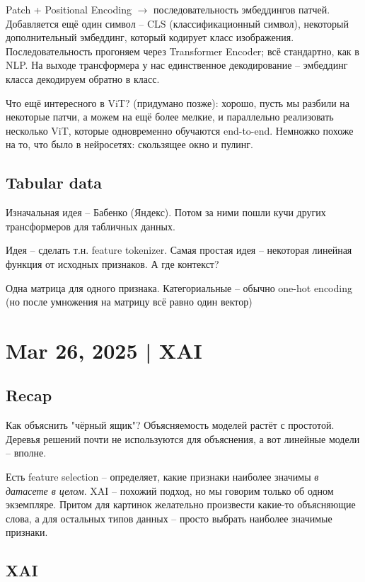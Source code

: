 \documentclass[a4paper,12pt]{article}
\begin{document}
Patch + Positional Encoding $ \to $ последовательность эмбеддингов патчей.
Добавляется ещё один символ -- CLS (классификационный символ), некоторый дополнительный эмбеддинг, который кодирует класс изображения.
Последовательность прогоняем через Transformer Encoder; всё стандартно, как в NLP.
На выходе трансформера у нас единственное декодирование -- эмбеддинг класса декодируем обратно в класс.

Что ещё интересного в ViT? (придумано позже): хорошо, пусть мы разбили на некоторые патчи, а можем на ещё более мелкие, и параллельно реализовать несколько ViT, которые одновременно обучаются end-to-end.
Немножко похоже на то, что было в нейросетях: скользящее окно и пулинг.

\subsection{Tabular data}

Изначальная идея -- Бабенко (Яндекс).
Потом за ними пошли кучи других трансформеров для табличных данных.

Идея -- сделать т.н. feature tokenizer.
Самая простая идея -- некоторая линейная функция от исходных признаков.
А где контекст?

Одна матрица для одного признака.
Категориальные -- обычно one-hot encoding (но после умножения на матрицу всё равно один вектор)

\section{Mar 26, 2025 | XAI}
\subsection{Recap}

Как объяснить "чёрный ящик"?
Объясняемость моделей растёт с простотой.
Деревья решений почти не используются для объяснения, а вот линейные модели -- вполне.

Есть feature selection -- определяет, какие признаки наиболее значимы \textit{в датасете в целом}.
XAI -- похожий подход, но мы говорим только об одном экземпляре.
Притом для картинок желательно произвести какие-то объясняющие слова, а для остальных типов данных -- просто выбрать наиболее значимые признаки.

\subsection{XAI}
\end{document}
